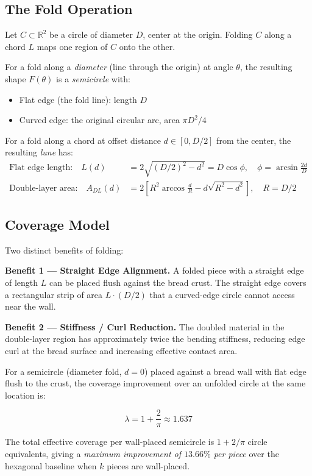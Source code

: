 \documentclass[12pt]{article}
\begin{document}
\subsection{The Fold Operation}

Let $C \subset \mathbb{R}^2$ be a circle of diameter $D$, center at the origin.
Folding $C$ along a chord $L$ maps one region of $C$ onto the other.

\begin{definition}
For a fold along a \emph{diameter} (line through the origin) at angle $\theta$,
the resulting shape $F(\theta)$ is a \emph{semicircle} with:
\begin{itemize}
\item Flat edge (the fold line): length $D$
\item Curved edge: the original circular arc, area $\pi D^2/4$
\end{itemize}
For a fold along a chord at offset distance $d \in [0, D/2]$ from the center,
the resulting \emph{lune} has:
\begin{align}
\text{Flat edge length:} \quad L(d) &= 2\sqrt{(D/2)^2 - d^2} = D\cos\phi, \quad \phi = \arcsin\frac{2d}{D} \label{eq:edge_length}\\
\text{Double-layer area:} \quad A_{DL}(d) &= 2\left[R^2\arccos\frac{d}{R} - d\sqrt{R^2-d^2}\right], \quad R = D/2 \label{eq:dl_area}
\end{align}
\end{definition}

\subsection{Coverage Model}

Two distinct benefits of folding:

\medskip\noindent\textbf{Benefit 1 — Straight Edge Alignment.}
A folded piece with a straight edge of length $L$ can be placed flush against
the bread crust. The straight edge covers a rectangular strip of area $L \cdot (D/2)$
that a curved-edge circle cannot access near the wall.

\medskip\noindent\textbf{Benefit 2 — Stiffness / Curl Reduction.}
The doubled material in the double-layer region has approximately twice the
bending stiffness, reducing edge curl at the bread surface and increasing
effective contact area.

\begin{theorem}
For a semicircle (diameter fold, $d=0$) placed against a bread wall with flat
edge flush to the crust, the coverage improvement over an unfolded circle at the
same location is:

\begin{equation}
\lambda = 1 + \frac{2}{\pi} \approx 1.637
\end{equation}

The total effective coverage per wall-placed semicircle is $1 + 2/\pi$ circle
equivalents, giving a \emph{maximum improvement of $13.66\%$ per piece} over the
hexagonal baseline when $k$ pieces are wall-placed.
\end{theorem}
\end{document}
